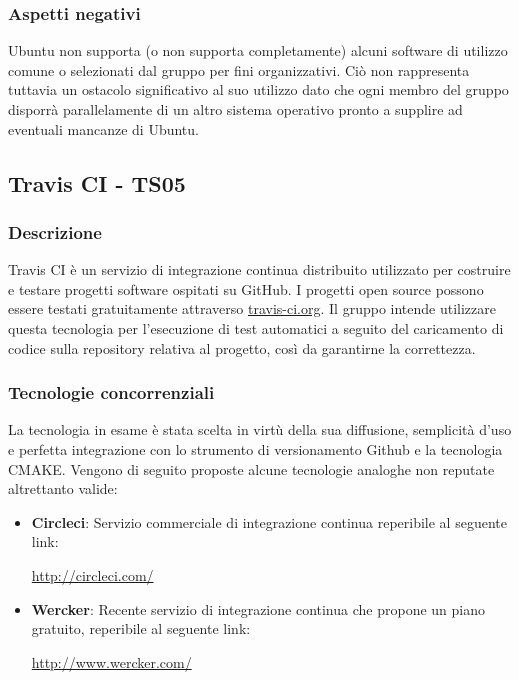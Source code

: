 \documentclass[./../Technology Baseline.tex]{subfiles}
\begin{document}
\subsubsection{Aspetti negativi}
Ubuntu non supporta (o non supporta completamente) alcuni software di utilizzo comune o selezionati dal gruppo per fini organizzativi. Ciò non rappresenta tuttavia un ostacolo significativo al suo utilizzo dato che ogni membro del gruppo disporrà parallelamente di un altro sistema operativo pronto a supplire ad eventuali mancanze di Ubuntu.  

\subsection{Travis CI - TS05}

\subsubsection{Descrizione}
Travis CI è un servizio di integrazione continua distribuito utilizzato per costruire e testare progetti software ospitati su GitHub. I progetti open source possono essere testati gratuitamente attraverso \url{travis-ci.org}. Il gruppo intende utilizzare questa tecnologia per l'esecuzione di test automatici a seguito del caricamento di codice sulla repository relativa al progetto, così da garantirne la correttezza.

\subsubsection{Tecnologie concorrenziali}
La tecnologia in esame è stata scelta in virtù della sua diffusione, semplicità d'uso e perfetta integrazione con lo strumento di versionamento Github e la tecnologia CMAKE. Vengono di seguito proposte alcune tecnologie analoghe non reputate altrettanto valide:

\begin{itemize}
	\item \textbf{Circleci}: Servizio commerciale di integrazione continua reperibile al seguente link:
	\begin{center}
		\url{http://circleci.com/}
	\end{center}

	\item \textbf{Wercker}: Recente servizio di integrazione continua che propone un piano gratuito, reperibile al seguente link:
	\begin{center}
		\url{http://www.wercker.com/}
	\end{center}
\end{itemize}
\end{document}
